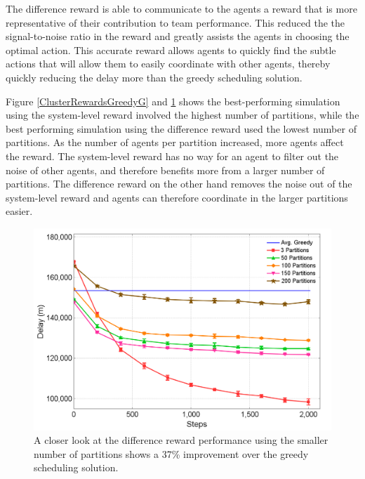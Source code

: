 \documentclass{aamas2014}
\begin{document}
The difference reward is able to communicate to the agents a reward that is more representative of their contribution to team performance. This reduced the the signal-to-noise ratio in the reward and greatly assists the agents in choosing the optimal action. This accurate reward allows agents to quickly find the subtle actions that will allow them to easily coordinate with other agents, thereby quickly reducing the delay more than the greedy scheduling solution. 

Figure \ref{ClusterRewardsGreedyG} and \ref{ATFMPOldDvsGreedy} shows the best-performing simulation using the system-level reward involved the highest number of partitions, while the best performing simulation using the difference reward used the lowest number of partitions. As the number of agents per partition increased, more agents affect the reward. The system-level reward has no way for an agent to filter out the noise of other agents, and therefore benefits more from a larger number of partitions. The difference reward on the other hand removes the noise out of the system-level reward and agents can therefore coordinate in the larger partitions easier.

\begin{figure}
\centering
\includegraphics[width=1.0\columnwidth]{ATFMPOldDvsGreedy}
\caption{A closer look at the difference reward performance using the smaller number of partitions shows a 37\% improvement over the greedy scheduling solution.}
\label{ATFMPOldDvsGreedy}
\end{figure}
\end{document}
